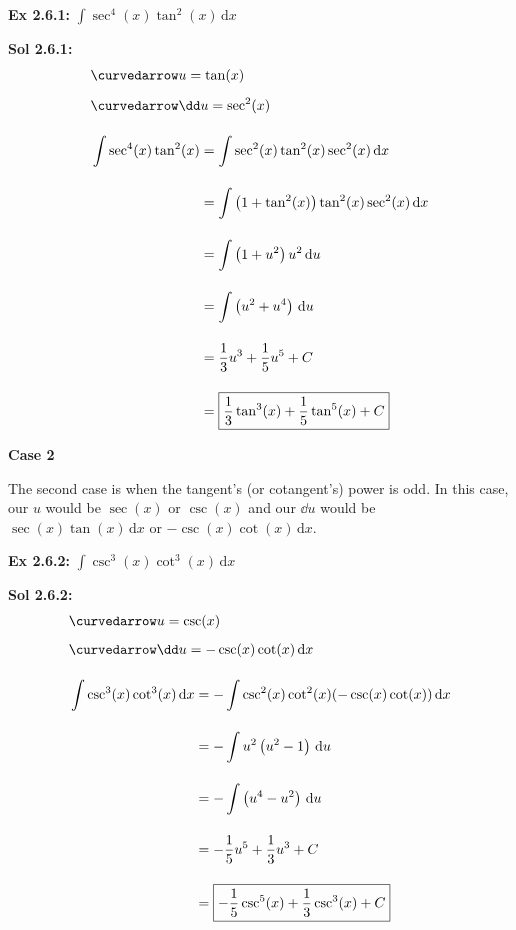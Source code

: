 \begin{tcolorbox}[example]
    \textbf{Ex 2.6.1: } $\int \sec^4 (x)\tan^2 (x) \,\mathrm{d}x$
\end{tcolorbox}
\begin{tcolorbox}[solution]
    \textbf{Sol 2.6.1: } \begin{align*}
        & \curvedarrow u = \tan (x) \\[5.5pt]
        & \curvedarrow \dd u = \sec^2 (x) \\[11pt]
        & \int \sec^4 (x)\tan^2 (x) \begin{aligned}[t]
            & = \int \sec^2 (x)\tan^2 (x)\sec^2 (x) \,\mathrm{d}x \\[11pt]
            & = \int \left(1 + \tan^2 (x)\right)\tan^2 (x)\sec^2 (x) \,\mathrm{d}x \\[11pt]
            & = \int \left(1 + u^2\right)u^2 \,\mathrm{d}u \\[11pt]
            & = \int \left(u^2 + u^4\right) \,\mathrm{d}u \\[11pt]
            & = \dfrac{1}{3}u^3 + \dfrac{1}{5}u^5 + C \\[11pt]
            & = \boxed{\dfrac{1}{3}\tan^3 (x) + \dfrac{1}{5}\tan^5 (x) + C}
        \end{aligned}
    \end{align*}
\end{tcolorbox} \vspace{11pt}

\textbf{Case 2} \par

The second case is when the tangent's (or cotangent's) power is odd. In this case, our $u$ would be $\sec(x)$ or $\csc(x)$ and our $\dd u$ would be $\sec (x)\tan (x) \,\mathrm{d}x$ or $-\csc (x)\cot (x) \,\mathrm{d}x$. \par

\begin{tcolorbox}[example]
    \textbf{Ex 2.6.2: } $\int \csc^3 (x)\cot^3 (x) \,\mathrm{d}x$
\end{tcolorbox}
\begin{tcolorbox}[solution]
    \textbf{Sol 2.6.2: } \begin{align*}
        & \curvedarrow u = \csc (x) \\[5.5pt]
        & \curvedarrow \dd u = -\csc (x)\cot (x) \,\mathrm{d}x \\[11pt]
        & \int \csc^3 (x)\cot^3 (x) \,\mathrm{d}x \begin{aligned}[t]
            & = -\int \csc^2 (x)\cot^2 (x)(-\csc (x)\cot (x)) \,\mathrm{d}x \\[11pt]
            & = -\int u^2\left(u^2 - 1\right) \,\mathrm{d}u \\[11pt]
            & = -\int \left(u^4 - u^2\right) \,\mathrm{d}u \\[11pt]
            & = -\dfrac{1}{5}u^5 + \dfrac{1}{3}u^3 + C \\[11pt]
            & = \boxed{-\dfrac{1}{5}\csc^5 (x) + \dfrac{1}{3}\csc^3 (x) + C}
        \end{aligned}
    \end{align*}
\end{tcolorbox}

